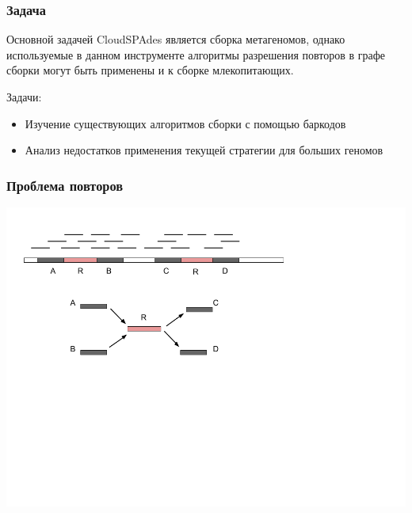 \documentclass[12pt,pdf,hyperref={unicode}]{beamer}
\begin{document}
\begin{frame}
\frametitle{Задача}
Основной задачей CloudSPAdes является сборка метагеномов, однако используемые в данном инструменте алгоритмы 
разрешения повторов в графе сборки могут быть применены и к сборке млекопитающих. 

\vspace{0.5cm}

Задачи:
\begin{itemize}
\item Изучение существующих алгоритмов сборки с помощью баркодов
\item Анализ недостатков применения текущей стратегии для больших геномов 
\end{itemize}

\end{frame}

\begin{frame}
\frametitle{Проблема повторов}
\includegraphics[scale=0.45]{repeats.png}
\end{frame}
\end{document}
